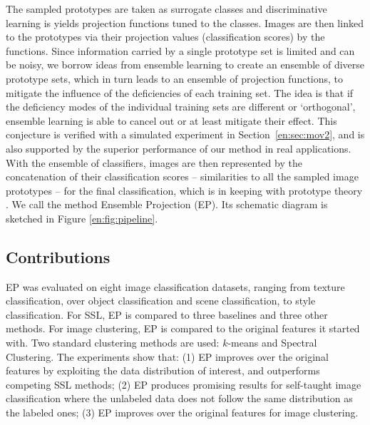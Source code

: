The sampled prototypes are taken as surrogate classes and
discriminative learning is yields projection functions tuned to the
classes. Images are then linked to the prototypes via their projection
values (classification scores) by the functions. Since information
carried by a single prototype set is limited and can be noisy, we
borrow ideas from ensemble learning \citep{EnClasReview} to create an
ensemble of diverse prototype sets, which in turn leads to an ensemble
of projection functions, to mitigate the influence of the deficiencies
of each training set. The idea is that if the deficiency modes of the
individual training sets are different or `orthogonal', ensemble
learning is able to cancel out or at least mitigate their effect. This
conjecture is verified with a simulated experiment in
Section~\ref{en:sec:mov2}, and is also supported by the superior performance
of our method in real applications. With the ensemble of classifiers,
images are then represented by the concatenation of their
classification scores -- similarities to all the sampled image
prototypes -- for the final classification, which is in keeping with
prototype theory \citep{Rosch:1978}. We call the method Ensemble
Projection (EP). Its schematic diagram is sketched in
Figure \ref{en:fig:pipeline}.

\subsection{Contributions}
EP was evaluated on eight image classification datasets, ranging from
texture classification, over object classification and scene
classification, to style classification. For SSL, EP is compared
to three baselines and three other methods. For image clustering, EP is
compared to the original features it started with. Two standard clustering methods are used: $k$-means and
Spectral Clustering.  The experiments show that: (1) EP improves over
the original features by exploiting the data distribution of interest, 
and outperforms competing SSL methods; (2) EP
produces promising results for self-taught image classification where
the unlabeled data does not follow the same distribution as the
labeled ones; (3) EP improves over the original features for image clustering.


